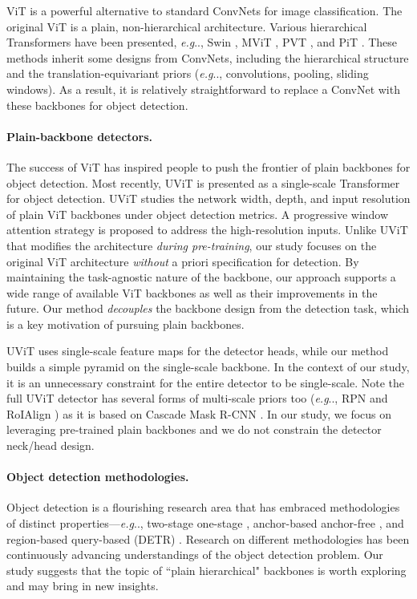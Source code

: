 \documentclass[runningheads]{llncs}
\makeatletter
\DeclareRobustCommand\onedot{\futurelet\@let@token\@onedot}
\def\@onedot{\ifx\@let@token.\else.\null\fi\xspace}
\def\eg{\emph{e.g}\onedot} \def\Eg{\emph{E.g}\onedot}
\makeatother
\begin{document}
ViT \cite{Dosovitskiy2021} is a powerful alternative to standard ConvNets for image classification. The original ViT is a plain, non-hierarchical architecture. Various hierarchical Transformers have been presented, \eg, Swin \cite{Liu2021}, MViT \cite{Fan2021,Li2021a}, PVT \cite{Wang2021}, and PiT \cite{Heo2021}. These methods inherit some designs from ConvNets, including the hierarchical structure and the translation-equivariant priors (\eg, convolutions, pooling, sliding windows). As a result, it is relatively straightforward to replace a ConvNet with these backbones for object detection.

\paragraph{Plain-backbone detectors.} The success of ViT has inspired people to push the frontier of plain backbones for object detection. Most recently, UViT \cite{Chen2021b} is presented as a single-scale Transformer for object detection.
UViT studies the network width, depth, and input resolution of plain ViT backbones under object detection metrics. A progressive window attention strategy is proposed to address the high-resolution inputs.
Unlike UViT that modifies the architecture \textit{during pre-training}, our study focuses on the original ViT architecture \textit{without} a priori specification for detection. By maintaining the task-agnostic nature of the backbone, our approach supports a wide range of available ViT backbones as well as their improvements in the future. Our method \textit{decouples} the backbone design from the detection task, which is a key motivation of pursuing plain backbones.

UViT uses single-scale feature maps for the detector heads, while our method builds a simple pyramid on the single-scale backbone. In the context of our study, it is an unnecessary constraint for the entire detector to be single-scale. Note the full UViT detector has several forms of multi-scale priors too (\eg, RPN \cite{Ren2015} and RoIAlign \cite{He2017}) as it is based on Cascade Mask R-CNN \cite{Cai2019}.
In our study, we focus on leveraging pre-trained plain backbones and we do not constrain the detector neck/head design.

\paragraph{Object detection methodologies.} Object detection is a flourishing research area that has embraced methodologies of distinct properties---\eg, two-stage \cite{Girshick2014,He2014,Girshick2015,Ren2015} \vs one-stage \cite{Redmon2016,Liu2016,Lin2017a}, anchor-based \cite{Ren2015} \vs anchor-free \cite{Law2018,Duan2019,Tian2019a}, and region-based \cite{Girshick2014,He2014,Girshick2015,Ren2015} \vs query-based (DETR) \cite{Carion2020}. Research on different methodologies has been continuously advancing understandings of the object detection problem. Our study suggests that the topic of ``plain \vs hierarchical" backbones is worth exploring and may bring in new insights.
\end{document}
